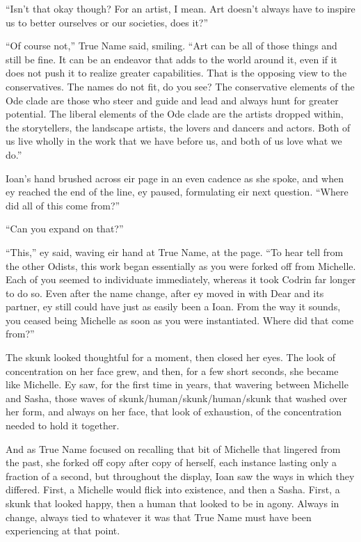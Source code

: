 ``Isn't that okay though? For an artist, I mean. Art doesn't always have to inspire us to better ourselves or our societies, does it?''

``Of course not,'' True Name said, smiling. ``Art can be all of those things and still be fine. It can be an endeavor that adds to the world around it, even if it does not push it to realize greater capabilities. That is the opposing view to the conservatives. The names do not fit, do you see? The conservative elements of the Ode clade are those who steer and guide and lead and always hunt for greater potential. The liberal elements of the Ode clade are the artists dropped within, the storytellers, the landscape artists, the lovers and dancers and actors. Both of us live wholly in the work that we have before us, and both of us love what we do.''

Ioan's hand brushed across eir page in an even cadence as she spoke, and when ey reached the end of the line, ey paused, formulating eir next question. ``Where did all of this come from?''

``Can you expand on that?''

``This,'' ey said, waving eir hand at True Name, at the page. ``To hear tell from the other Odists, this work began essentially as you were forked off from Michelle. Each of you seemed to individuate immediately, whereas it took Codrin far longer to do so. Even after the name change, after ey moved in with Dear and its partner, ey still could have just as easily been a Ioan. From the way it sounds, you ceased being Michelle as soon as you were instantiated. Where did that come from?''

The skunk looked thoughtful for a moment, then closed her eyes. The look of concentration on her face grew, and then, for a few short seconds, she became like Michelle. Ey saw, for the first time in years, that wavering between Michelle and Sasha, those waves of skunk/human/skunk/human/skunk that washed over her form, and always on her face, that look of exhaustion, of the concentration needed to hold it together.

And as True Name focused on recalling that bit of Michelle that lingered from the past, she forked off copy after copy of herself, each instance lasting only a fraction of a second, but throughout the display, Ioan saw the ways in which they differed. First, a Michelle would flick into existence, and then a Sasha. First, a skunk that looked happy, then a human that looked to be in agony. Always in change, always tied to whatever it was that True Name must have been experiencing at that point.

